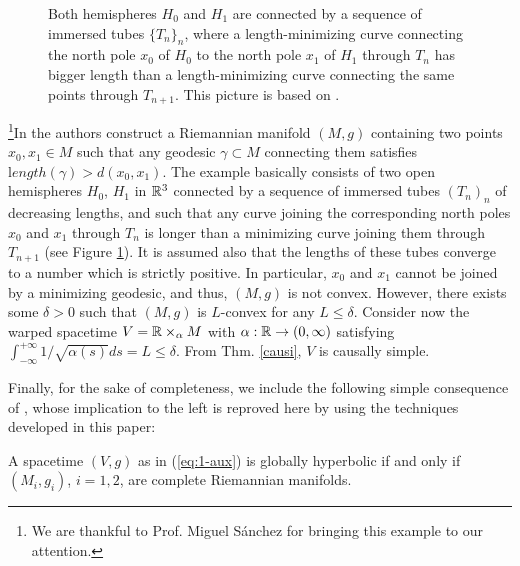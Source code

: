 \begin{exe}
\begin{figure}
  \caption{\label{fig:1} Both hemispheres $H_0$ and $H_1$ are connected by a sequence of immersed tubes $\{T_n\}_n$, where a length-minimizing curve connecting the north pole $x_0$ of $H_0$ to the north pole $x_1$ of $H_1$ through $T_n$ has bigger length than a length-minimizing curve connecting the same points through $T_{n+1}$. This picture is based on \cite[Figure 1]{Bartolo2002}.}
\end{figure}


\footnote{We are thankful to Prof. Miguel Sánchez for bringing this example to our attention.}In \cite[Section 2.1]{Bartolo2002} the authors construct a Riemannian manifold $(M,g)$ containing two points $x_0, x_1\in M$ such that any geodesic $\gamma\subset M$ connecting them satisfies ${\mathrm length}(\gamma)>d(x_0,x_1)$. The example basically consists of two open hemispheres $H_0$, $H_1$ in ${\mathbb R}^3$ connected by a sequence of immersed tubes $(T_n)_n$ of decreasing lengths, and such that any curve joining the corresponding north poles $x_0$ and $x_1$ through $T_n$ is longer than a minimizing curve joining them through $T_{n+1}$ (see Figure \ref{fig:1}). It is assumed also that the lengths of these tubes converge to a number which is strictly positive. In particular, $x_{0}$ and $x_{1}$ cannot be joined by a minimizing geodesic, and thus,
$(M,g)$ is not convex. However, there exists some $\delta>0$ such that $(M,g)$ is $L$-convex for any $L\leq \delta$. Consider now the warped spacetime $V={\mathbb R}\times_{\alpha}M$ with $\alpha:{\mathbb R}\rightarrow (0,\infty)$ satisfying $\int_{-\infty}^{+\infty}1/\sqrt{\alpha(s)}ds=L\leq\delta$. From Thm. \ref{causi}, $V$ is causally simple.
\end{exe}

Finally, for the sake of completeness, we include the following simple consequence of \cite[Th. 3.68]{beem}, whose implication to the left is reproved here by using the techniques developed in this paper:

\begin{thm}
A \multiwarped spacetime $(V,g)$ as in (\ref{eq:1-aux}) is globally hyperbolic if and only if $(M_{i},g_{i})$, $i=1,2$, are complete Riemannian manifolds.
\end{thm}

